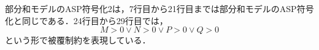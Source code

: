 

\newpage
部分和モデルのASP符号化2は，7行目から21行目までは部分和モデルのASP符号化と同じである．24行目から29行目では，\[
												 M>0 \vee N>0 \vee P>0 \vee Q>0
												  \]
という形で被覆制約を表現している．

